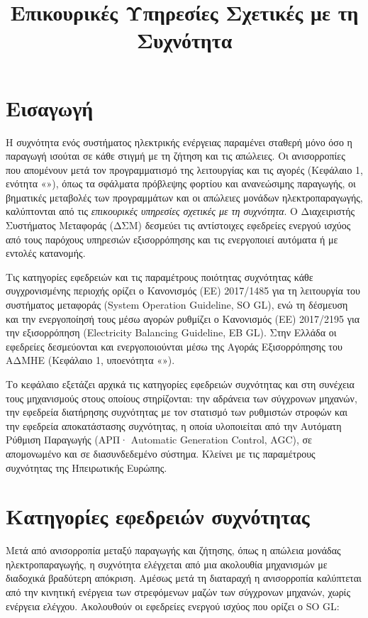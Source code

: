 \title{Επικουρικές Υπηρεσίες Σχετικές με τη Συχνότητα}

\section{Εισαγωγή}
\label{kef-03-theoria}

Η συχνότητα ενός συστήματος ηλεκτρικής ενέργειας παραμένει σταθερή μόνο όσο η παραγωγή ισούται
σε κάθε στιγμή με τη ζήτηση και τις απώλειες. Οι ανισορροπίες που απομένουν μετά τον
προγραμματισμό της λειτουργίας και τις αγορές (Κεφάλαιο 1, ενότητα «»),
όπως τα σφάλματα πρόβλεψης φορτίου και ανανεώσιμης παραγωγής, οι βηματικές μεταβολές των
προγραμμάτων και οι απώλειες μονάδων ηλεκτροπαραγωγής, καλύπτονται από τις \emph{επικουρικές
υπηρεσίες σχετικές με τη συχνότητα}. Ο Διαχειριστής Συστήματος Μεταφοράς (ΔΣΜ) δεσμεύει τις
αντίστοιχες εφεδρείες ενεργού ισχύος από τους παρόχους υπηρεσιών εξισορρόπησης και τις
ενεργοποιεί αυτόματα ή με εντολές κατανομής.

Τις κατηγορίες εφεδρειών και τις παραμέτρους ποιότητας συχνότητας κάθε συγχρονισμένης περιοχής
ορίζει ο Κανονισμός (ΕΕ) 2017/1485 για τη λειτουργία του συστήματος μεταφοράς (System
Operation Guideline, SO GL), ενώ τη δέσμευση και την ενεργοποίησή τους μέσω αγορών ρυθμίζει ο
Κανονισμός (ΕΕ) 2017/2195 για την εξισορρόπηση (Electricity Balancing Guideline, EB GL). Στην
Ελλάδα οι εφεδρείες δεσμεύονται και ενεργοποιούνται μέσω της Αγοράς Εξισορρόπησης του ΑΔΜΗΕ
(Κεφάλαιο 1, υποενότητα «»).

Το κεφάλαιο εξετάζει αρχικά τις κατηγορίες εφεδρειών συχνότητας και στη συνέχεια τους
μηχανισμούς στους οποίους στηρίζονται: την αδράνεια των σύγχρονων μηχανών, την εφεδρεία
διατήρησης συχνότητας με τον στατισμό των ρυθμιστών στροφών και την εφεδρεία αποκατάστασης
συχνότητας, η οποία υλοποιείται από την Αυτόματη Ρύθμιση Παραγωγής (ΑΡΠ· Automatic Generation
Control, AGC), σε απομονωμένο και σε διασυνδεδεμένο σύστημα. Κλείνει με τις παραμέτρους
συχνότητας της Ηπειρωτικής Ευρώπης.

\section{Κατηγορίες εφεδρειών συχνότητας}
\label{sec:reserves}

Μετά από ανισορροπία μεταξύ παραγωγής και ζήτησης, όπως η απώλεια μονάδας ηλεκτροπαραγωγής, η
συχνότητα ελέγχεται από μια ακολουθία μηχανισμών με διαδοχικά βραδύτερη απόκριση. Αμέσως μετά
τη διαταραχή η ανισορροπία καλύπτεται από την κινητική ενέργεια των στρεφόμενων μαζών των
σύγχρονων μηχανών, χωρίς ενέργεια ελέγχου. Ακολουθούν οι εφεδρείες ενεργού ισχύος που ορίζει ο
SO GL:

